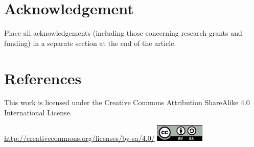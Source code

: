 \documentclass[12pt,a4paper]{elex2017}
\begin{document}
\section{Acknowledgement} 

Place all acknowledgements (including those concerning research grants and
funding) in a separate section at the end of the article.

\section{References}

\printbibliography[
    type={book},
    notkeyword={dictionary},
    title={Books}
]
\printbibliography[
    type={incollection},
    title={Book Sections}
]
\printbibliography[
    type={inproceedings},
    title={Paper in conference proceedings}
]
\printbibliography[
    type={article},
    title={Journal Articles}
]
\printbibliography[
    type={techreport},
    title={Technical Reports}
]
\printbibliography[
    type={misc},
    title={Web Sites and Other Resources}
]
\printbibliography[
    type={book},
    keyword={dictionary},
    title={Dictionaries}
]


\medskip
\begin{minipage}[t]{\textwidth}
    \noindent This work is licensed under the Creative Commons Attribution
    ShareAlike 4.0 International License.
    \vspace{-2ex}
    \begin{center}%
        \url{http://creativecommons.org/licenses/by-sa/4.0/}\linebreak
        \includegraphics[width=2.33cm]{cc.png}%
    \end{center}
\end{minipage}
\end{document}
